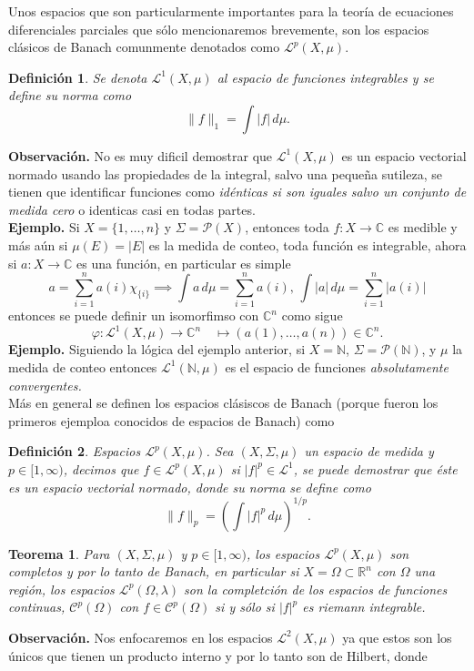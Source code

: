 \documentclass[letterpaper]{book}
\newtheorem{teorema}{Teorema}[section]
\newtheorem{def.}{Definici\'on}[section]
\newcommand{\nat}{\ensuremath{ \mathbb N }}
\newcommand{\eje}{{\noindent \sc \textbf{Ejemplo. }}}
\newcommand{\obs}{{\noindent \sc \textbf{Observación. }}}
\newcommand{\om}{\ensuremath{\Omega}}
\newcommand{\sig}{\ensuremath{\Sigma}}
\newcommand{\co}{\ensuremath{\mathbb C }}
\newcommand{\con}{\ensuremath{\mathbb{C}^n}}
\newcommand{\re}{\ensuremath{\mathbb R }}
\begin{document}
\noindent Unos espacios que son particularmente importantes para la teoría de ecuaciones diferenciales parciales que sólo mencionaremos brevemente, son los espacios clásicos de Banach comunmente denotados como $\mathcal{L}^p(X,\mu)$.
\begin{def.}
  Se denota $\mathcal{L}^1(X,\mu)$ al espacio de funciones integrables y se define su norma como
\[
  \|f\|_1=\int|f|\,d\mu.
\]
  \end{def.}
\obs No es muy dificil demostrar que $\mathcal{L}^1(X,\mu)$ es un espacio vectorial normado usando las propiedades de la integral, salvo una pequeña sutileza, se tienen que identificar funciones como \emph{idénticas si son iguales salvo un conjunto de medida cero} o identicas casi en todas partes.\\
\eje Si $X=\{1,\dots,n\}$ y $\sig=\mathcal{P}(X)$, entonces toda $f:X\to\co$ es medible y más aún si $\mu(E)=|E|$ es la medida de conteo, toda función es integrable, ahora si $a:X\to\co$ es una función, en particular es simple
\[
 a=\sum^n_{i=1}a(i)\chi_{\{i\}}\implies\int a\,d\mu=\sum^n_{i=1}a(i),\,\int |a|\,d\mu=\sum^n_{i=1}|a(i)|
 \]
entonces se puede definir un isomorfimso con $\con$ como sigue
\[
\varphi:\mathcal{L}^1(X,\mu)\to\con\quad\mapsto(a(1),\dots,a(n))\in\con.
\]
\eje Siguiendo la lógica del ejemplo anterior, si $X=\nat$, $\sig=\mathcal{P}(\nat)$, y $\mu$ la medida de conteo entonces $\mathcal{L}^1(\nat,\mu)$ es el espacio de funciones \emph{absolutamente convergentes.}\\
Más en general se definen los espacios clásiscos de Banach (porque fueron los primeros ejemploa conocidos de espacios de Banach) como
\begin{def.}{Espacios $\mathcal{L}^p(X,\mu)$.} Sea $(X,\sig,\mu)$ un espacio de medida y $p\in[1,\infty)$, decimos que $f\in\mathcal{L}^p(X,\mu)$ si $|f|^p\in\mathcal{L}^1$, se puede demostrar que éste es un espacio vectorial normado, donde su norma se define como
\[
\|f\|_p = \left(\int |f|^p \, d\mu\right)^{1/p}.
\]
\end{def.}
\begin{teorema}
  Para $(X,\sig,\mu)$ y $p\in[1,\infty)$, los espacios $\mathcal{L}^p(X,\mu)$ son completos y por lo tanto de Banach, en particular si $X=\om\subset\re^n$ con $\om$ una región, los espacios $\mathcal{L}^p(\om,\lambda)$ son la completción de los espacios de funciones continuas, $\mathcal{C}^{p}(\om)$ con $f\in\mathcal{C}^{p}(\om)$ si y sólo si $|f|^p$ es riemann integrable.
  \end{teorema}
\obs Nos enfocaremos en los espacios $\mathcal{L}^2(X,\mu)$ ya que estos son los únicos que tienen un producto interno y por lo tanto son de Hilbert, donde
\end{document}
